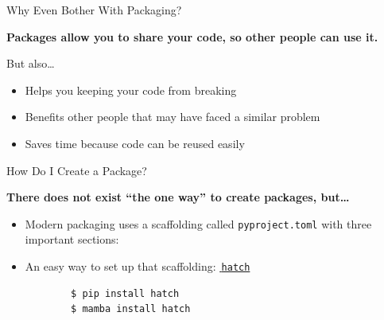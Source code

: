 \begin{frame}{Why Even Bother With Packaging?}
  \begin{center}
    \huge\textcolor{ccyan!90!cblack}{\textbf{Packages allow you to share your code, so other people can use it.}}
  \end{center}
  \vspace{2em}
  \textcolor{cpink}{But also\dots}
  \begin{itemize}
    \setlength{\itemsep}{1em}
    \item Helps you keeping your code from breaking
    \item Benefits other people that may have faced a similar problem
    \item Saves time because code can be reused easily
  \end{itemize}
\end{frame}

\begin{frame}[fragile]{How Do I Create a Package?}
  \begin{center}
    \huge\textcolor{ccyan!90!cblack}{\textbf{There does not exist \enquote{the one way} to create packages, but\dots}}
  \end{center}
  \vspace{1em}
  \begin{itemize}
    \setlength{\itemsep}{1em}
    \item Modern packaging uses a scaffolding called \texttt{pyproject.toml} with three important sections:
    \item An easy way to set up that scaffolding: \href{https://hatch.pypa.io/latest/}{{\footnotesize{\faExternalLink*}}\,\texttt{hatch}}
      \begin{verbatim}
        $ pip install hatch
        $ mamba install hatch
      \end{verbatim}
  \end{itemize}
\end{frame}

